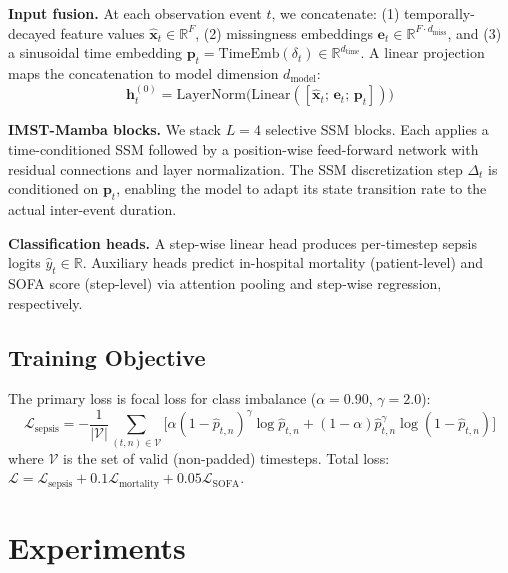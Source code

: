 \documentclass[twoside,11pt]{article}
\begin{document}
\textbf{Input fusion.}
At each observation event $t$, we concatenate: (1) temporally-decayed feature
values $\hat{\mathbf{x}}_t \in \mathbb{R}^F$, (2) missingness embeddings
$\mathbf{e}_t \in \mathbb{R}^{F \cdot d_\text{miss}}$, and (3) a sinusoidal
time embedding $\mathbf{p}_t = \text{TimeEmb}(\delta_t) \in \mathbb{R}^{d_\text{time}}$.
A linear projection maps the concatenation to model dimension $d_\text{model}$:
\begin{equation}
  \mathbf{h}_t^{(0)} = \text{LayerNorm}\bigl(\text{Linear}(
    [\hat{\mathbf{x}}_t;\, \mathbf{e}_t;\, \mathbf{p}_t])\bigr)
\end{equation}

\textbf{IMST-Mamba blocks.}
We stack $L=4$ selective SSM blocks.  Each applies a time-conditioned SSM
followed by a position-wise feed-forward network with residual connections and
layer normalization.  The SSM discretization step $\Delta_t$ is conditioned on
$\mathbf{p}_t$, enabling the model to adapt its state transition rate to the
actual inter-event duration.

\textbf{Classification heads.}
A step-wise linear head produces per-timestep sepsis logits
$\hat{y}_t \in \mathbb{R}$.  Auxiliary heads predict in-hospital mortality
(patient-level) and SOFA score (step-level) via attention pooling and
step-wise regression, respectively.

\subsection{Training Objective}
\label{sec:loss}

The primary loss is focal loss \citep{lin2017focal} for class imbalance
($\alpha=0.90$, $\gamma=2.0$):
\begin{equation}
  \mathcal{L}_\text{sepsis} = -\frac{1}{|\mathcal{V}|}\sum_{(t,n) \in \mathcal{V}}
    \bigl[\alpha(1-\hat{p}_{t,n})^\gamma \log \hat{p}_{t,n}
    + (1-\alpha)\hat{p}_{t,n}^\gamma \log(1-\hat{p}_{t,n})\bigr]
\end{equation}
where $\mathcal{V}$ is the set of valid (non-padded) timesteps.  Total loss:
$\mathcal{L} = \mathcal{L}_\text{sepsis} + 0.1\mathcal{L}_\text{mortality}
+ 0.05\mathcal{L}_\text{SOFA}$.

\section{Experiments}
\label{sec:experiments}
\end{document}
